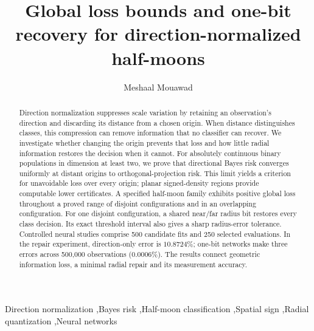 \documentclass[a4paper,fleqn]{cas-dc}
\begin{document}
\let\WriteBookmarks\relax
\renewcommand{\printorcid}{}
\title[mode=title]{Global loss bounds and one-bit recovery for direction-normalized half-moons}
\author[1]{Meshaal Mouawad}
\cormark[1]
\begin{abstract}
Direction normalization suppresses scale variation by retaining an observation's direction and discarding its distance from a chosen origin. When distance distinguishes classes, this compression can remove information that no classifier can recover. We investigate whether changing the origin prevents that loss and how little radial information restores the decision when it cannot. For absolutely continuous binary populations in dimension at least two, we prove that directional Bayes risk converges uniformly at distant origins to orthogonal-projection risk. This limit yields a criterion for unavoidable loss over every origin; planar signed-density regions provide computable lower certificates. A specified half-moon family exhibits positive global loss throughout a proved range of disjoint configurations and in an overlapping configuration. For one disjoint configuration, a shared near/far radius bit restores every class decision. Its exact threshold interval also gives a sharp radius-error tolerance. Controlled neural studies comprise 500 candidate fits and 250 selected evaluations. In the repair experiment, direction-only error is $10.8724\%$; one-bit networks make three errors across 500,000 observations ($0.0006\%$). The results connect geometric information loss, a minimal radial repair and its measurement accuracy.
\end{abstract}
\begin{keywords}
Direction normalization \sep Bayes risk \sep Half-moon classification \sep Spatial sign \sep Radial quantization \sep Neural networks
\end{keywords}
\maketitle
\end{document}
